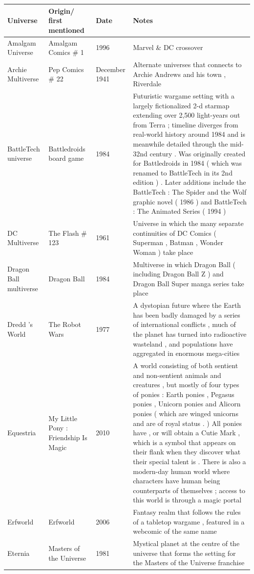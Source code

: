 \documentclass{article}
\begin{document}
\begin{tabular}{llll}
\toprule
Universe & Origin/ first mentioned & Date & Notes \\
\midrule
Amalgam Universe & Amalgam Comics \# 1 & 1996 & Marvel \& DC crossover \\
Archie Multiverse & Pep Comics \# 22 & December 1941 & Alternate universes that connects to Archie Andrews and his town , Riverdale \\
BattleTech universe & Battledroids board game & 1984 & Futuristic wargame setting with a largely fictionalized 2-d starmap extending over 2,500 light-years out from Terra ; timeline diverges from real-world history around 1984 and is meanwhile detailed through the mid-32nd century . Was originally created for Battledroids in 1984 ( which was renamed to BattleTech in its 2nd edition ) . Later additions include the BattleTech : The Spider and the Wolf graphic novel ( 1986 ) and BattleTech : The Animated Series ( 1994 ) \\
DC Multiverse & The Flash \# 123 & 1961 & Universe in which the many separate continuities of DC Comics ( Superman , Batman , Wonder Woman ) take place \\
Dragon Ball multiverse & Dragon Ball & 1984 & Multiverse in which Dragon Ball ( including Dragon Ball Z ) and Dragon Ball Super manga series take place \\
Dredd 's World & The Robot Wars & 1977 & A dystopian future where the Earth has been badly damaged by a series of international conflicts , much of the planet has turned into radioactive wasteland , and populations have aggregated in enormous mega-cities \\
Equestria & My Little Pony : Friendship Is Magic & 2010 & A world consisting of both sentient and non-sentient animals and creatures , but mostly of four types of ponies : Earth ponies , Pegasus ponies , Unicorn ponies and Alicorn ponies ( which are winged unicorns and are of royal status . ) All ponies have , or will obtain a Cutie Mark , which is a symbol that appears on their flank when they discover what their special talent is . There is also a modern-day human world where characters have human being counterparts of themselves ; access to this world is through a magic portal \\
Erfworld & Erfworld & 2006 & Fantasy realm that follows the rules of a tabletop wargame , featured in a webcomic of the same name \\
Eternia & Masters of the Universe & 1981 & Mystical planet at the centre of the universe that forms the setting for the Masters of the Universe franchise \\

\end{tabular}
\end{document}
